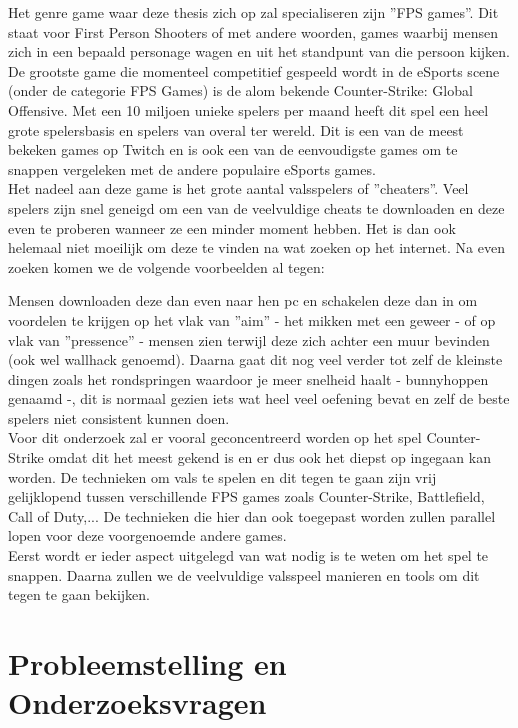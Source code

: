 \documentclass[pdftex,a4paper,12pt,twoside]{report}
\begin{document}
Het genre game waar deze thesis zich op zal specialiseren zijn ''FPS games''. Dit staat voor First Person Shooters of met andere woorden, games waarbij mensen zich in een bepaald personage wagen en uit het standpunt van die persoon kijken. De grootste game die momenteel competitief gespeeld wordt in de eSports scene (onder de categorie FPS Games) is de alom bekende Counter-Strike: Global Offensive. 
 Met een 10 miljoen unieke spelers per maand heeft dit spel een heel grote spelersbasis en spelers van overal ter wereld. Dit is een van de meest bekeken games op Twitch en is ook een van de eenvoudigste games om te snappen vergeleken met de andere populaire eSports games. \citep{csgoblog}
\\

Het nadeel aan deze game is het grote aantal valsspelers of ''cheaters''. Veel spelers zijn snel geneigd om een van de veelvuldige cheats te downloaden en deze even te proberen wanneer ze een minder moment hebben. Het is dan ook helemaal niet moeilijk om deze te vinden na wat zoeken op het internet. Na even zoeken komen we de volgende voorbeelden al tegen:

 Mensen downloaden deze dan even naar hen pc en schakelen deze dan in om voordelen te krijgen op het vlak van ''aim'' - het mikken met een geweer - of op vlak van ''pressence'' - mensen zien terwijl deze zich achter een muur bevinden (ook wel wallhack genoemd). Daarna gaat dit nog veel verder tot zelf de kleinste dingen zoals het rondspringen waardoor je meer snelheid haalt - bunnyhoppen genaamd -, dit is normaal gezien iets wat heel veel oefening bevat en zelf de beste spelers niet consistent kunnen doen. 
\\

Voor dit onderzoek zal er vooral geconcentreerd worden op het spel Counter-Strike omdat dit het meest gekend is en er dus ook het diepst op ingegaan kan worden. De technieken om vals te spelen en dit tegen te gaan zijn vrij gelijklopend tussen verschillende FPS games zoals Counter-Strike, Battlefield, Call of Duty,... De technieken die hier dan ook toegepast worden zullen parallel lopen voor deze voorgenoemde andere games.
\\

Eerst wordt er ieder aspect uitgelegd van wat nodig is te weten om het spel te snappen. Daarna zullen we de veelvuldige valsspeel manieren en tools om dit tegen te gaan bekijken.


\section{Probleemstelling en Onderzoeksvragen}
\label{sec:onderzoeksvragen}
\end{document}
